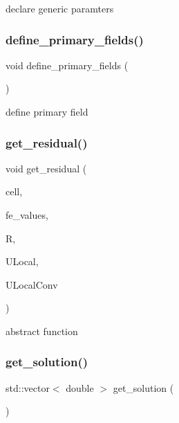 declare generic paramters \mbox{\label{classmechano_chem_f_e_m_a3d9afee26426f7a184185dba31a2d138}} 
\subsubsection{\texorpdfstring{define\_primary\_fields()}{define\_primary\_fields()}}
{\footnotesize\ttfamily void define\+\_\+primary\+\_\+fields (\begin{DoxyParamCaption}{ }\end{DoxyParamCaption})}

define primary field \mbox{\label{classmechano_chem_f_e_m_ac8f2c3e2a1040c70b709900dc3dfdaea}} 
\subsubsection{\texorpdfstring{get\_residual()}{get\_residual()}}
{\footnotesize\ttfamily void get\+\_\+residual (\begin{DoxyParamCaption}\item[{const typename hp\+::\+Do\+F\+Handler$<$ dim $>$\+::active\+\_\+cell\+\_\+iterator \&}]{cell,  }\item[{const F\+E\+Values$<$ dim $>$ \&}]{fe\+\_\+values,  }\item[{Table$<$ 1, Sacado\+::\+Fad\+::\+D\+Fad$<$ double $>$ $>$ \&}]{R,  }\item[{Table$<$ 1, Sacado\+::\+Fad\+::\+D\+Fad$<$ double $>$$>$ \&}]{U\+Local,  }\item[{Table$<$ 1, double $>$ \&}]{U\+Local\+Conv }\end{DoxyParamCaption})\hspace{0.3cm}{\ttfamily [virtual]}}

abstract function \mbox{\label{classmechano_chem_f_e_m_a7c52028f5388b9cc83fbc90e842fda22}} 
\subsubsection{\texorpdfstring{get\_solution()}{get\_solution()}}
{\footnotesize\ttfamily std\+::vector$<$ double $>$ get\+\_\+solution (\begin{DoxyParamCaption}{ }\end{DoxyParamCaption})\hspace{0.3cm}{\ttfamily [virtual]}}

